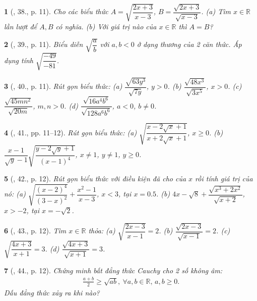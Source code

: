 \documentclass{article}
\newtheorem{baitoan}{}
\begin{document}
\begin{baitoan}[\cite{SBT_Toan_9_tap_1}, 38., p. 11]
	Cho các biểu thức $A = \sqrt{\dfrac{2x + 3}{x - 3}}$, $B = \dfrac{\sqrt{2x + 3}}{\sqrt{x - 3}}$. (a) Tìm $x\in\mathbb{R}$ lần lượt để $A,B$ có nghĩa. (b) Với giá trị nào của $x\in\mathbb{R}$ thì $A = B$?
\end{baitoan}

\begin{baitoan}[\cite{SBT_Toan_9_tap_1}, 39., p. 11]
	Biểu diễn $\sqrt{\dfrac{a}{b}}$ với $a,b < 0$ ở dạng thương của 2 căn thức. Áp dụng tính $\sqrt{\dfrac{-49}{-81}}$.
\end{baitoan}

\begin{baitoan}[\cite{SBT_Toan_9_tap_1}, 40., p. 11]
	Rút gọn biểu thức: (a) $\dfrac{\sqrt{63y^3}}{\sqrt{7y}}$, $y > 0$. (b) $\dfrac{\sqrt{48x^3}}{\sqrt{3x^5}}$, $x > 0$. (c) $\dfrac{\sqrt{45mn^2}}{\sqrt{20m}}$, $m,n > 0$. (d) $\dfrac{\sqrt{16a^4b^6}}{\sqrt{128a^6b^6}}$, $a < 0$, $b\ne0$.
\end{baitoan}

\begin{baitoan}[\cite{SBT_Toan_9_tap_1}, 41., pp. 11--12]
	Rút gọn biểu thức: (a) $\sqrt{\dfrac{x - 2\sqrt{x} + 1}{x + 2\sqrt{x} + 1}}$, $x\ge0$. (b) $\dfrac{x - 1}{\sqrt{y} - 1}\sqrt{\dfrac{y - 2\sqrt{y} + 1}{(x - 1)^4}}$, $x\ne1$, $y\ne1$, $y\ge0$.
\end{baitoan}

\begin{baitoan}[\cite{SBT_Toan_9_tap_1}, 42., p. 12]
	Rút gọn biểu thức với điều kiện đã cho của $x$ rồi tính giá trị của nó: (a) $\sqrt{\dfrac{(x - 2)^4}{(3 - x)^2}} + \dfrac{x^2 - 1}{x - 3}$, $x < 3$, tại $x = 0.5$. (b) $4x - \sqrt{8} + \dfrac{\sqrt{x^3 + 2x^2}}{\sqrt{x + 2}}$, $x > -2$, tại $x = -\sqrt{2}$.
\end{baitoan}

\begin{baitoan}[\cite{SBT_Toan_9_tap_1}, 43., p. 12]
	Tìm $x\in\mathbb{R}$ thỏa: (a) $\sqrt{\dfrac{2x - 3}{x - 1}} = 2$. (b) $\dfrac{\sqrt{2x - 3}}{\sqrt{x - 1}} = 2$. (c) $\sqrt{\dfrac{4x + 3}{x + 1}} = 3$. (d) $\dfrac{\sqrt{4x + 3}}{\sqrt{x + 1}} = 3$.
\end{baitoan}

\begin{baitoan}[\cite{SBT_Toan_9_tap_1}, 44., p. 12]
	Chứng minh bất đẳng thức Cauchy cho 2 số không âm:
	\begin{align*}
		\frac{a + b}{2}\ge\sqrt{ab},\ \forall a,b\in\mathbb{R},\,a,b\ge0.
	\end{align*}
	Dấu đẳng thức xảy ra khi nào?
\end{baitoan}
\end{document}
